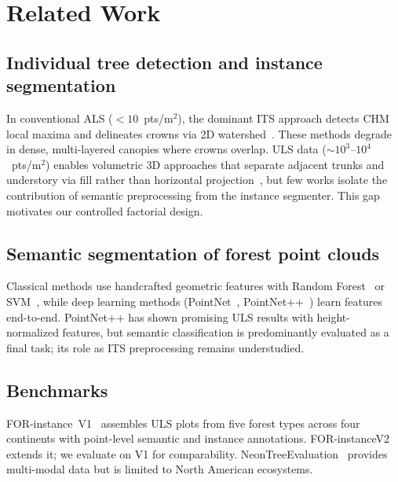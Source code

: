 \documentclass[runningheads]{llncs}
\begin{document}
\section{Related Work}\label{sec:related}

\subsection{Individual tree detection and instance segmentation}

In conventional ALS (${<}10$~pts/m$^2$), the dominant ITS approach detects CHM local maxima and delineates crowns via 2D watershed~\cite{popescu2002,silva2016,dalponte2016}. These methods degrade in dense, multi-layered canopies where crowns overlap. ULS data (${\sim}10^3$--$10^4$~pts/m$^2$) enables volumetric 3D approaches that separate adjacent trunks and understory via fill rather than horizontal projection~\cite{dalponte2016}, but few works isolate the contribution of semantic preprocessing from the instance segmenter. This gap motivates our controlled factorial design.

\subsection{Semantic segmentation of forest point clouds}

Classical methods use handcrafted geometric features with Random Forest~\cite{breiman2001} or SVM~\cite{weinmann2015,weinmann2017}, while deep learning methods (PointNet~\cite{qi2016}, PointNet++~\cite{qi2017}) learn features end-to-end. PointNet++ has shown promising ULS results with height-normalized features, but semantic classification is predominantly evaluated as a final task; its role as ITS preprocessing remains understudied.

\subsection{Benchmarks}

FOR-instance~V1~\cite{puliti2023} assembles ULS plots from five forest types across four continents with point-level semantic and instance annotations. FOR-instanceV2~\cite{xiang2025} extends it; we evaluate on V1 for comparability. NeonTreeEvaluation~\cite{weinstein2021} provides multi-modal data but is limited to North American ecosystems.
\end{document}
